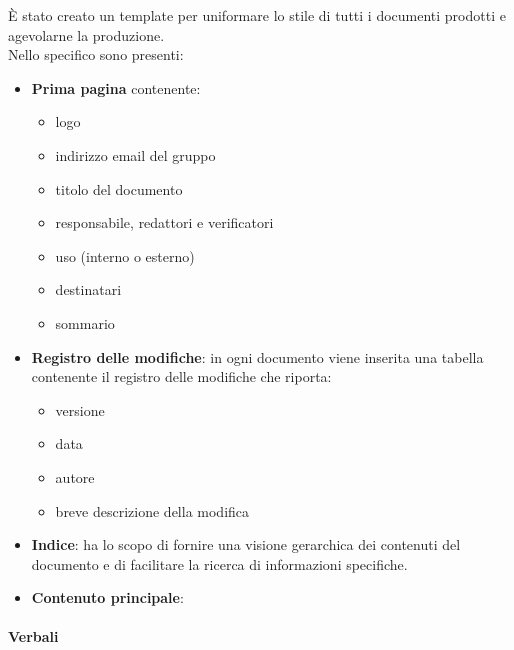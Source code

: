         È stato creato un template per uniformare lo stile di tutti i documenti prodotti e agevolarne la produzione.\\
        Nello specifico sono presenti:
        \begin{itemize}
            \item \textbf{Prima pagina} contenente:
            \begin {itemize} 
                \item logo
                \item indirizzo email del gruppo
                \item titolo del documento
                \item responsabile, redattori e verificatori
                \item uso (interno o esterno)
                \item destinatari
                \item sommario
            \end{itemize}
            \item \textbf{Registro delle modifiche}: in ogni documento viene inserita una tabella contenente il registro delle modifiche che riporta: 
            \begin{itemize}
                \item versione
                \item data
                \item autore
                \item breve descrizione della modifica
            \end{itemize}
            \item \textbf{Indice}: ha lo scopo di fornire una visione gerarchica dei contenuti del documento e di facilitare la ricerca di informazioni specifiche.
            \item \textbf{Contenuto principale}: %
        \end{itemize}

        \paragraph{Verbali} ~


